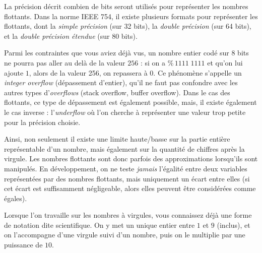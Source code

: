\documentclass[11pt,a4paper]{article}
\begin{document}
\bigskip

La précision décrit combien de bits seront utilisés pour représenter les nombres flottants.
Dans la norme IEEE 754, il existe plusieurs formats pour représenter les flottants, dont la \textit{simple précision} (sur 32 bits), la \textit{double précision} (sur 64 bits), et la \textit{double précision étendue} (sur 80 bits).

\bigskip

Parmi les contraintes que vous aviez déjà vus, un nombre entier codé sur 8 bits ne pourra pas aller au delà de la valeur $ 256 $ : si on a $ \% \, 1111 \; 1111 $ et qu'on lui ajoute $ 1 $, alors de la valeur 256, on repassera à 0.
Ce phénomène s'appelle un \textit{integer overflow} (dépassement d'entier), qu'il ne faut pas confondre avec les autres types d'\textit{overflows} (stack overflow, buffer overflow).
Dans le cas des flottants, ce type de dépassement est également possible, mais, il existe également le cas inverse : l'\textit{underflow} où l'on cherche à représenter une valeur trop petite pour la précision choisie.

\medskip

\begin{center}
\begin{figure}[ht!]
\end{figure}
\end{center}

Ainsi, non seulement il existe une limite haute/basse sur la partie entière représentable d'un nombre, mais également sur la quantité de chiffres après la virgule.
Les nombres flottants sont donc parfois des approximations lorsqu'ils sont manipulés.
En développement, on ne teste \textit{jamais} l'égalité entre deux variables représentées par des nombres flottants, mais uniquement un écart entre elles (si cet écart est suffisamment négligeable, alors elles peuvent être considérées comme égales).

\bigskip

Lorsque l'on travaille sur les nombres à virgules, vous connaissez déjà une forme de notation dite scientifique.
On y met un unique entier entre $ 1 $ et $ 9 $ (inclus), et on l'accompagne d'une virgule suivi d'un nombre, puis on le multiplie par une puissance de $ 10 $.
\end{document}

